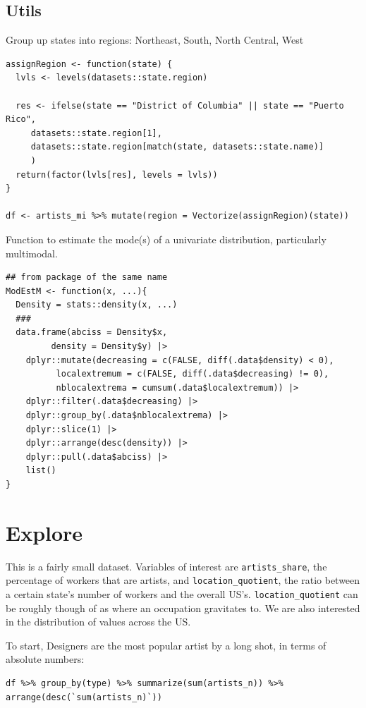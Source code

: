 \documentclass[8pt]{article}
\begin{document}
\subsection{Utils}
\label{sec:orgc1e1348}
Group up states into regions: Northeast, South, North Central, West
\begin{verbatim}
assignRegion <- function(state) {
  lvls <- levels(datasets::state.region)

  res <- ifelse(state == "District of Columbia" || state == "Puerto Rico",
	 datasets::state.region[1],
	 datasets::state.region[match(state, datasets::state.name)]
	 )
  return(factor(lvls[res], levels = lvls))
}

df <- artists_mi %>% mutate(region = Vectorize(assignRegion)(state))
\end{verbatim}

Function to estimate the mode(s) of a univariate distribution, particularly multimodal.
\begin{verbatim}
## from package of the same name
ModEstM <- function(x, ...){
  Density = stats::density(x, ...)
  ###
  data.frame(abciss = Density$x,
	     density = Density$y) |>
    dplyr::mutate(decreasing = c(FALSE, diff(.data$density) < 0),
		  localextremum = c(FALSE, diff(.data$decreasing) != 0),
		  nblocalextrema = cumsum(.data$localextremum)) |>
    dplyr::filter(.data$decreasing) |>
    dplyr::group_by(.data$nblocalextrema) |>
    dplyr::slice(1) |>
    dplyr::arrange(desc(density)) |>
    dplyr::pull(.data$abciss) |>
    list()
}
\end{verbatim}

\begin{latex}
\pagebreak
\end{latex}
\section{Explore}
\label{sec:orga39b450}
This is a fairly small dataset. Variables of interest are \texttt{artists\_share}, the percentage of workers that are artists, and \texttt{location\_quotient}, the ratio between a certain state's number of workers and the overall US's. \texttt{location\_quotient} can be roughly though of as where an occupation gravitates to. We are also interested in the distribution of values across the US.

To start, Designers are the most popular artist by a long shot, in terms of absolute numbers:
\begin{verbatim}
df %>% group_by(type) %>% summarize(sum(artists_n)) %>% arrange(desc(`sum(artists_n)`))
\end{verbatim}
\end{document}
